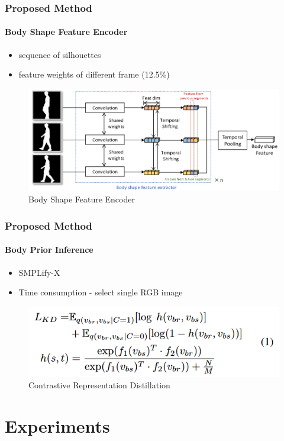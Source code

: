 \documentclass[
	11pt, %
	aspectratio=169, %
]{beamer}
\begin{document}
\begin{frame}
	\frametitle{Proposed Method}
	\framesubtitle{Body Shape Feature Encoder}
	
	\begin{itemize}
		\item sequence of silhouettes 
		\item feature weights of different frame (12.5\%)
	\end{itemize}

	\begin{figure}
		\centering
		\includegraphics[width=0.8\linewidth]{"./Images/shape_encoder.png"}
		\caption{Body Shape Feature Encoder}
	\end{figure}
\end{frame}

\begin{frame}
	\frametitle{Proposed Method}
	\framesubtitle{Body Prior Inference}
	
	\begin{itemize}
		\item SMPLify-X
		\item Time consumption - select single RGB image
	\end{itemize}

	\begin{figure}
		\centering
		\includegraphics[width=0.8\linewidth]{"./Images/knowledge_distillation.png"}
		\caption{Contrastive Representation Distillation}
	\end{figure}
\end{frame}


\section{Experiments}
\end{document}
